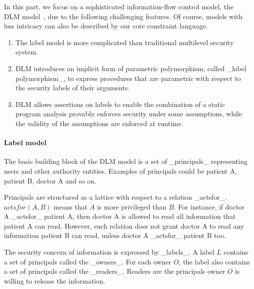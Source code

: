 
In this part, we focus on a sophisticated information-flow control model, the
DLM model~\cite{ml-ifc-97}, due to the following challenging features. Of
course, models with less intricacy can also be described by our core constraint
language.

\begin{enumerate}
\item The label model is more complicated than traditional multilevel security
system.

\item DLM introduces an implicit form of parametric polymorphism, called _label
polymorphism_, to express procedures that are parametric with respect to the
security labels of their arguments.

\item DLM allows assertions on labels to enable the combination of a static
program analysis provably enforces security under some assumptions, while the
validity of the assumptions are enforced at runtime. 
\end{enumerate}

\paragraph{Label model}

The basic building block of the DLM model is a set of _principals_ representing
users and other authority entities. Examples of principals could be patient A,
patient B, doctor A and so on. 

Principals are structured as a lattice with respect to a relation _actsfor_.
$actsfor(A,B)$ means that $A$ is more privileged than $B$.
% 
For instance, if doctor A _actsfor_ patient A, then doctor A is allowed to read
all information that patient A can read. However, such relation does not grant
doctor A to read any information patient B can read, unless doctor A _actsfor_
patient B too.

The security concern of information is expressed by _labels_. A label $L$
contains a set of principals called the _owners_. For each owner $O$, the label
also contains a set of principals called the _readers_. Readers are the
principals owner $O$ is willing to release the information. 

